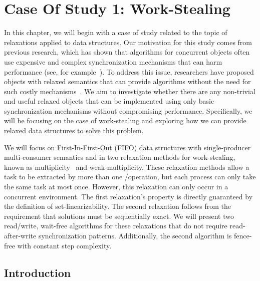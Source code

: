 \chapter{\label{chapter:4_work-stealing}Case Of Study 1: Work-Stealing}

In this chapter, we will begin with a case of study related to the topic of relaxations applied to data structures. Our motivation for this study comes from previous research, which has shown that algorithms for concurrent objects often use expensive and complex synchronization mechanisms that can harm performance (see, for example~\cite{DBLP_conf_popl_AttiyaGHKMV11,DBLP_journals_toplas_Herlihy91}). To address this issue, researchers have proposed objects with relaxed semantics that can provide algorithms without the need for such costly mechanisms~\cite{maged.vechev.2009,fencefreework}. We aim to investigate whether there are any non-trivial and useful relaxed objects that can be implemented using only basic synchronization mechanisms without compromising performance. Specifically, we will be focusing on the case of work-stealing and exploring how we can provide relaxed data structures to solve this problem.

We will focus on First-In-First-Out (FIFO) data structures with single-producer multi-consumer semantics and in two relaxation methods for work-stealing, known as multiplicity~\cite{DBLP_journals_dc_CastanedaRR23} and weak-multiplicity. These relaxation methods allow a task to be extracted by more than one \Take/\Steal operation, but each process can only take the same task at most once. However, this relaxation can only occur in a concurrent environment. The first relaxation's property is directly guaranteed by the definition of set-linearizability. The second relaxation follows from the requirement that solutions must be sequentially exact. We will present two read/write, wait-free algorithms for these relaxations that do not require read-after-write synchronization patterns. Additionally, the second algorithm is fence-free with constant step complexity.


\section{Introduction}

